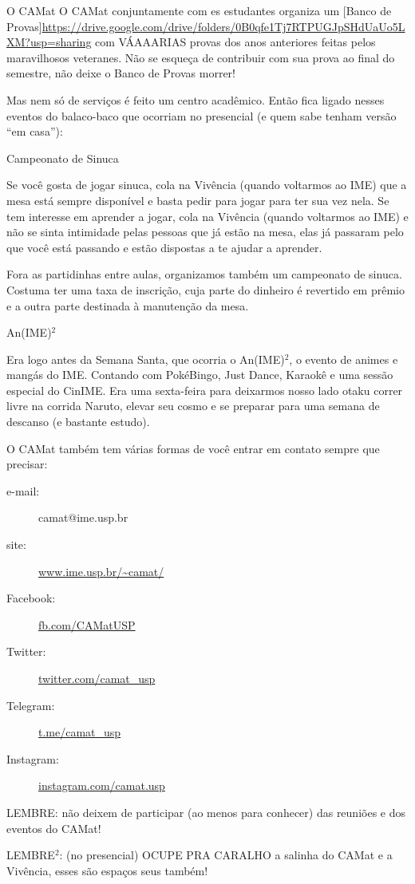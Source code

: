 \begin{secao}{O CAMat}
O CAMat conjuntamente com es estudantes organiza um
[Banco de Provas]\url{https://drive.google.com/drive/folders/0B0qfe1Tj7RTPUGJpSHdUaUo5LXM?usp=sharing}
com VÁAAARIAS provas dos anos anteriores feitas pelos maravilhosos veteranes.
Não se esqueça de contribuir com sua prova ao final do semestre, não
deixe o Banco de Provas morrer!

  
Mas nem só de serviços é feito um centro acadêmico. Então fica ligado nesses
eventos do balaco-baco que ocorriam no presencial (e quem sabe tenham versão “em casa”):

\begin{subsecao}{Campeonato de Sinuca}

Se você gosta de jogar sinuca, cola na Vivência (quando voltarmos ao IME) que
a mesa está sempre disponível e basta pedir para jogar para ter sua vez nela.
Se tem interesse em aprender a jogar, cola na Vivência (quando voltarmos ao IME)
e não se sinta intimidade pelas pessoas que já estão na mesa, elas já passaram pelo
que você está passando e estão dispostas a te ajudar a aprender.

Fora as partidinhas entre aulas, organizamos também um campeonato de sinuca. Costuma
ter uma taxa de inscrição, cuja parte do dinheiro é revertido em prêmio e a outra parte
destinada à manutenção da mesa.

\end{subsecao}

\begin{subsecao}{An(IME)\texorpdfstring{$^2$}{²}}

Era logo antes da Semana Santa, que ocorria o An(IME)$^2$, o evento de animes e
mangás do IME. Contando com PokéBingo, Just Dance, Karaokê e uma sessão especial do CinIME.
Era uma sexta-feira para deixarmos nosso lado otaku correr livre na corrida Naruto,
elevar seu cosmo e se preparar para uma semana de descanso (e bastante estudo).

\end{subsecao}


O CAMat também tem várias formas de você entrar em contato sempre que precisar:

\begin{description}
\item [e-mail:] camat@ime.usp.br
\item [site:] \url{www.ime.usp.br/~camat/}
\item [Facebook:] \url{fb.com/CAMatUSP}
\item [Twitter:] \url{twitter.com/camat_usp}
\item [Telegram:] \url{t.me/camat_usp}
\item [Instagram:] \url{instagram.com/camat.usp}
\end{description}

LEMBRE: não deixem de participar (ao menos para conhecer) das reuniões e dos eventos do CAMat!

LEMBRE$^2$: (no presencial) OCUPE PRA CARALHO a salinha do CAMat e a Vivência,
esses são espaços seus também!

\end{secao}

